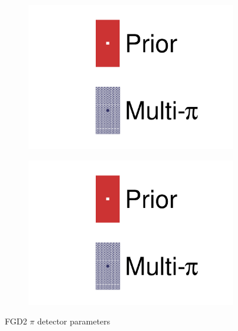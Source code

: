 \begin{figure}[h]
	\begin{subfigure}[t]{0.32\textwidth}
		\includegraphics[width=\textwidth,page=48, trim={0mm 0mm 0mm 0mm}, clip]{figures/mach3/2018/data/2018a_FixedCov_RedCov_Mpi_Data_merge_drawPar_withDet}
	\end{subfigure}
	\begin{subfigure}[t]{0.32\textwidth}
		\includegraphics[width=\textwidth,page=49, trim={0mm 0mm 0mm 0mm}, clip]{figures/mach3/2018/data/2018a_FixedCov_RedCov_Mpi_Data_merge_drawPar_withDet}
	\end{subfigure}
	\caption{FGD2 $\pi$ detector parameters}
	\label{fig:data_multipi_det_fdg2_cc0pi_nubar}
\end{figure}

